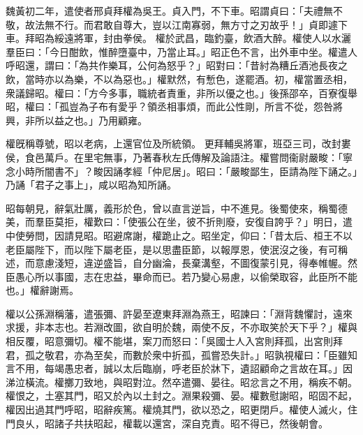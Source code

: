 \begin{pinyinscope}
 
魏黃初二年，遣使者邢貞拜權為吳王。貞入門，不下車。昭謂貞曰：「夫禮無不敬，故法無不行。而君敢自尊大，豈以江南寡弱，無方寸之刃故乎！」貞即遽下車。拜昭為綏遠將軍，封由拳侯。
 權於武昌，臨釣臺，飲酒大醉。權使人以水灑羣臣曰：「今日酣飲，惟醉墮臺中，乃當止耳。」昭正色不言，出外車中坐。權遣人呼昭還，謂曰：「為共作樂耳，公何為怒乎？」昭對曰：「昔紂為糟丘酒池長夜之飲，當時亦以為樂，不以為惡也。」權默然，有慙色，遂罷酒。初，權當置丞相，衆議歸昭。權曰：「方今多事，職統者責重，非所以優之也。」後孫邵卒，百寮復舉昭，權曰：「孤豈為子布有愛乎？領丞相事煩，而此公性剛，所言不從，怨咎將興，非所以益之也。」乃用顧雍。
 
 
權旣稱尊號，昭以老病，上還官位及所統領。
 更拜輔吳將軍，班亞三司，改封婁侯，食邑萬戶。在里宅無事，乃著春秋左氏傳解及論語注。權嘗問衞尉嚴畯：「寧念小時所闇書不」？畯因誦孝經「仲尼居」。昭曰：「嚴畯鄙生，臣請為陛下誦之。」乃誦「君子之事上」，咸以昭為知所誦。
 
 
 
 
 昭每朝見，辭氣壯厲，義形於色，曾以直言逆旨，中不進見。後蜀使來，稱蜀德美，而羣臣莫拒，權歎曰：「使張公在坐，彼不折則廢，安復自誇乎？」明日，遣中使勞問，因請見昭。昭避席謝，權跪止之。昭坐定，仰曰：「昔太后、桓王不以老臣屬陛下，而以陛下屬老臣，是以思盡臣節，以報厚恩，使泯沒之後，有可稱述，而意慮淺短，違逆盛旨，自分幽淪，長棄溝壑，不圖復蒙引見，得奉帷幄。然臣愚心所以事國，志在忠益，畢命而已。若乃變心易慮，以偷榮取容，此臣所不能也。」權辭謝焉。
 
 
權以公孫淵稱藩，遣張彌、許晏至遼東拜淵為燕王，昭諫曰：「淵背魏懼討，遠來求援，非本志也。若淵改圖，欲自明於魏，兩使不反，不亦取笑於天下乎？」權與相反覆，昭意彌切。權不能堪，案刀而怒曰：「吳國士人入宮則拜孤，出宮則拜君，孤之敬君，亦為至矣，而數於衆中折孤，孤嘗恐失計。」昭孰視權曰：「臣雖知言不用，每竭愚忠者，誠以太后臨崩，呼老臣於牀下，遺詔顧命之言故在耳。」因涕泣橫流。權擲刀致地，與昭對泣。然卒遣彌、晏往。昭忿言之不用，稱疾不朝。權恨之，土塞其門，昭又於內以土封之。淵果殺彌、晏。權數慰謝昭，昭固不起，權因出過其門呼昭，昭辭疾篤。權燒其門，欲以恐之，昭更閉戶。權使人滅火，住門良乆，昭諸子共扶昭起，權載以還宮，深自克責。昭不得已，然後朝會。
 

\end{pinyinscope}
